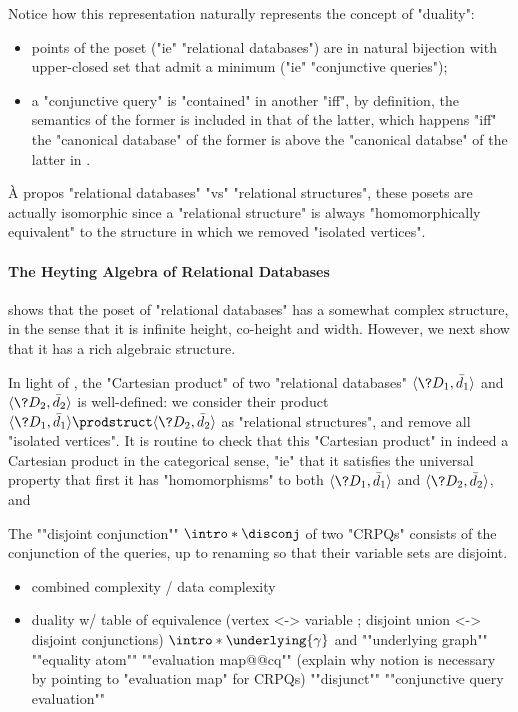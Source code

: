 Notice how this representation naturally represents the concept of "duality":
\begin{itemize}
	\item points of the poset ("ie" "relational databases") are in natural
		bijection with upper-closed set that admit a minimum ("ie" "conjunctive queries");
	\item a "conjunctive query" is "contained" in another "iff", by definition,
		the semantics of the former is included in that of the latter, which happens
		"iff" the "canonical database" of the former is above the "canonical databse" of the latter
		in .
\end{itemize}

\begin{remark}
	\label{rk:database-vs-structures}
	À propos "relational databases" "vs" "relational structures",
	these posets are actually isomorphic 
	since a "relational structure" is always "homomorphically equivalent"
	to the structure in which we removed "isolated vertices".
\end{remark}

\paragraph*{The Heyting Algebra of Relational Databases}

 shows that the poset of "relational databases" has a somewhat
complex structure, in the sense that it is infinite height, co-height and width.
However, we next show that it has a rich algebraic structure.

In light of , the "Cartesian product"
of two "relational databases" $\tup{\?D_1,\bar d_1}$ and $\tup{\?D_2,\bar d_2}$
is well-defined: we consider their product $\tup{\?D_1,\bar d_1} \prodstruct \tup{\?D_2,\bar d_2}$
as "relational structures", and remove all "isolated vertices".
It is routine to check that this "Cartesian product" in indeed a Cartesian product in
the categorical sense, "ie" that it satisfies the universal property
that first it has "homomorphisms" to both $\tup{\?D_1,\bar d_1}$ and $\tup{\?D_2,\bar d_2}$,
and  



The \AP""disjoint conjunction"" \AP$\intro*\disconj$ of two "CRPQs" consists of
the conjunction of the queries, up to renaming so that their variable sets are disjoint.

\begin{itemize}
	\item combined complexity / data complexity
	\item duality w/ table of equivalence (vertex <-> variable ; disjoint union <-> disjoint conjunctions)
	\itemAP $\intro*\underlying{\gamma}$ and ""underlying graph""
	\itemAP ""equality atom""
	\itemAP ""evaluation map@@cq"" (explain why notion is necessary by pointing to "evaluation map" for CRPQs)
	\itemAP ""disjunct""
	\itemAP ""conjunctive query evaluation""
\end{itemize}

